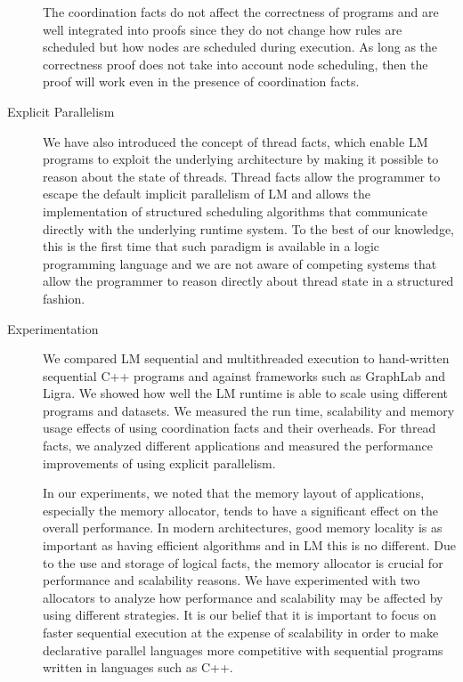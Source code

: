 \begin{description}
The coordination facts do not affect the correctness of programs and are well
integrated into proofs since they do not change how rules are scheduled but how
nodes are scheduled during execution. As long as the correctness proof does not
take into account node scheduling, then the proof will work even in the presence
of coordination facts.

\item[Explicit Parallelism]

We have also introduced the concept of thread facts, which enable LM programs to
exploit the underlying architecture by making it possible to reason about the
state of threads. Thread facts allow the programmer to escape the default
implicit parallelism of LM and allows the implementation of structured
scheduling algorithms that communicate directly with the underlying runtime
system. To the best of our knowledge, this is the first time that such paradigm
is available in a logic programming language and we are not aware of competing
systems that allow the programmer to reason directly about thread state in a
structured fashion.

\item[Experimentation]

We compared LM sequential and multithreaded execution to hand-written sequential
C++ programs and against frameworks such as GraphLab and Ligra. We showed how
well the LM runtime is able to scale using different programs and datasets. We
measured the run time, scalability and memory usage effects of using
coordination facts and their overheads. For thread facts, we analyzed different
applications and measured the performance improvements of using explicit
parallelism.

In our experiments, we noted that the memory layout of applications, especially
the memory allocator, tends to have a significant effect on the overall
performance. In modern architectures, good memory locality is as important as
having efficient algorithms and in LM this is no different. Due to the use and
storage of logical facts, the memory allocator is crucial for performance and
scalability reasons. We have experimented with two allocators to analyze how
performance and scalability may be affected by using different strategies. It is
our belief that it is important to focus on faster sequential execution at the
expense of scalability in order to make declarative parallel languages more
competitive with sequential programs written in languages such as C++.

\end{description}

